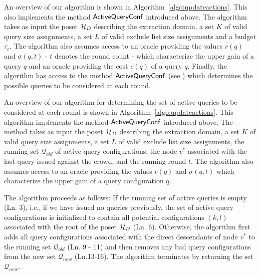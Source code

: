 An overview of our algorithm is shown in Algorithm~\ref{algo:updateactions}. This also implements the method ${\sf ActiveQueryConf}$ introduced above. The algorithm takes as input the poset $\mathcal{H}_D$ describing the extraction domain, a set $K$ of valid query size assignments, a set $L$ of valid exclude list size assignments and a budget $\tau_c$. The algorithm also assumes access to an oracle providing the values $r(q)$ and $\sigma(q,t)$ - $t$ denotes the round count -  which characterize the upper gain of a query $q$ and an oracle providing the cost $c(q)$ of a query $q$. Finally, the algorithm has access to the method ${\sf ActiveQueryConf}$ (see ) which determines the possible queries to be considered at each round.

An overview of our algorithm for determining the set of active queries to be considered at each round is shown in Algorithm~\ref{algo:updateactions}. This algorithm implements the method ${\sf ActiveQueryConf}$ introduced above. The method takes as input the poset $\mathcal{H}_D$ describing the extraction domain, a set $K$ of valid query size assignments, a set $L$ of valid exclude list size assignments, the running set $\mathcal{Q}_{old}$ of active query configurations, the node $v^*$ associated with the last query issued against the crowd, and the running round $t$. The algorithm also assumes access to an oracle providing the values $r(q)$ and $\sigma(q,t)$  which characterize the upper gain of a query configuration $q$.

The algorithm proceeds as follows: If the running set of active queries is empty (Ln. 3), i.e., if we have issued no queries previously, the set of active query configurations is initialized to contain all potential configurations $(k,l)$ associated with the root of the poset $\mathcal{H}_D$ (Ln. 6). Otherwise, the algorithm first adds all query configurations associated with the direct descendants of node $v^*$ to the running set $\mathcal{Q}_{old}$ (Ln. 9 - 11) and then removes any bad query configurations from the new set $\mathcal{Q}_{new}$ (Ln.13-16). The algorithm terminates by returning the set $\mathcal{Q}_{new}$.

